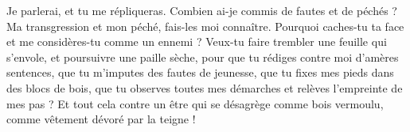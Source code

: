 \lettrine{J}{}e parlerai, et tu me répliqueras.
Combien ai-je commis de fautes et de péchés ? Ma transgression et mon péché, fais-les moi connaître.
Pourquoi caches-tu ta face et me considères-tu comme un ennemi ?
Veux-tu faire trembler une feuille qui s’envole, et poursuivre une paille sèche,
pour que tu rédiges contre moi d’amères sentences, que tu m’imputes des fautes de jeunesse,
que tu fixes mes pieds dans des blocs de bois, que tu observes toutes mes démarches et relèves l’empreinte de mes pas ?
Et tout cela contre un être qui se désagrège comme bois vermoulu, comme vêtement dévoré par la teigne !